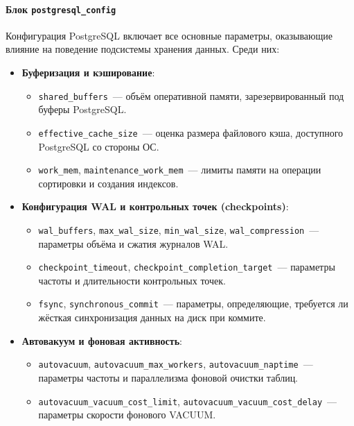 \paragraph{Блок \texttt{postgresql\_config}}

Конфигурация PostgreSQL включает все основные параметры, оказывающие влияние на поведение подсистемы хранения данных. Среди них:

\begin{itemize}
  \item \textbf{Буферизация и кэширование}:
    \begin{itemize}
      \item \texttt{shared\_buffers}~--- объём оперативной памяти, зарезервированный под буферы PostgreSQL.
      \item \texttt{effective\_cache\_size}~--- оценка размера файлового кэша, доступного PostgreSQL со стороны ОС.
      \item \texttt{work\_mem}, \texttt{maintenance\_work\_mem}~--- лимиты памяти на операции сортировки и создания индексов.
    \end{itemize}

  \item \textbf{Конфигурация WAL и контрольных точек (checkpoints)}:
    \begin{itemize}
      \item \texttt{wal\_buffers}, \texttt{max\_wal\_size}, \texttt{min\_wal\_size}, \texttt{wal\_compression}~--- параметры объёма и сжатия журналов WAL.
      \item \texttt{checkpoint\_timeout}, \texttt{checkpoint\_completion\_target}~--- параметры частоты и длительности контрольных точек.
      \item \texttt{fsync}, \texttt{synchronous\_commit}~--- параметры, определяющие, требуется ли жёсткая синхронизация данных на диск при коммите.
    \end{itemize}

  \item \textbf{Автовакуум и фоновая активность}:
    \begin{itemize}
      \item \texttt{autovacuum}, \texttt{autovacuum\_max\_workers}, \texttt{autovacuum\_naptime}~--- параметры частоты и параллелизма фоновой очистки таблиц.
      \item \texttt{autovacuum\_vacuum\_cost\_limit}, \texttt{autovacuum\_vacuum\_cost\_delay}~--- параметры скорости фонового VACUUM.
    \end{itemize}


\end{itemize}
